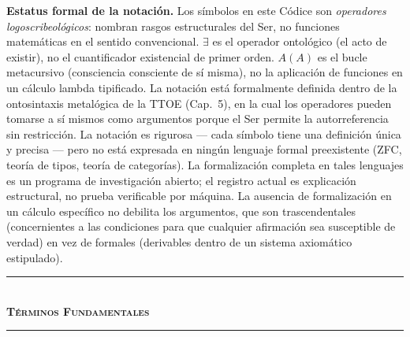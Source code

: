 \documentclass[10pt, openany, oneside]{book}
\renewcommand{\normalsize}{\fontsize{10}{13}\selectfont}
\renewcommand{\footnotesize}{\fontsize{8.5}{11}\selectfont}
\begin{document}
\vspace{0.5em}

{\footnotesize
\noindent\textbf{Estatus formal de la notación.} Los símbolos en este Códice son \textit{operadores logoscribeológicos}: nombran rasgos estructurales del Ser, no funciones matemáticas en el sentido convencional. $\exists$ es el operador ontológico (el acto de existir), no el cuantificador existencial de primer orden. $A(A)$ es el bucle metacursivo (consciencia consciente de sí misma), no la aplicación de funciones en un cálculo lambda tipificado. La notación está formalmente definida dentro de la ontosintaxis metalógica de la TTOE (Cap.\ 5), en la cual los operadores pueden tomarse a sí mismos como argumentos porque el Ser permite la autorreferencia sin restricción. La notación es rigurosa --- cada símbolo tiene una definición única y precisa --- pero no está expresada en ningún lenguaje formal preexistente (ZFC, teoría de tipos, teoría de categorías). La formalización completa en tales lenguajes es un programa de investigación abierto; el registro actual es explicación estructural, no prueba verificable por máquina. La ausencia de formalización en un cálculo específico no debilita los argumentos, que son trascendentales (concernientes a las condiciones para que cualquier afirmación sea susceptible de verdad) en vez de formales (derivables dentro de un sistema axiomático estipulado).
}

\vspace{1.5em}

\newpage


\begin{center}
    \rule{0.3\textwidth}{0.4pt}\\[0.5em]
    {\normalsize\bfseries\scshape Términos Fundamentales}\\[0.3em]
    \rule{0.3\textwidth}{0.4pt}
\end{center}

\vspace{1em}
\end{document}
